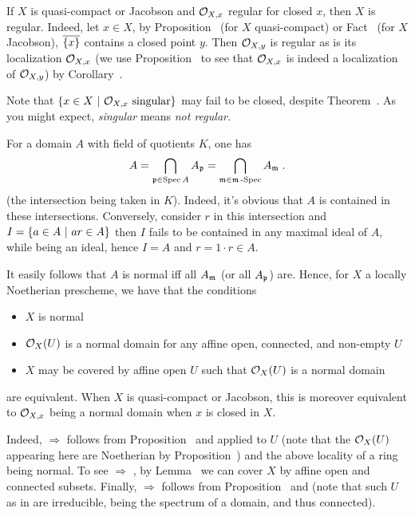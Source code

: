 \documentclass[a4paper,parskip=half,numbers=enddot, DIV=12]{scrreprt}
\begin{document}
\begin{rem*}
    \begin{alphanumerate}
    \item   
        If $X$ is quasi-compact or Jacobson and $\mathcal{O}_{X,x}$ regular for closed $x$, then $X$ is regular. Indeed, let $x\in X$, by Proposition~ (for $X$ quasi-compact) or Fact~ (for $X$ Jacobson), $\overline{\{x\}}$ contains a closed point $y$. Then $\mathcal{O}_{X,y}$ is regular as is its localization $\mathcal{O}_{X,x}$ (we  use Proposition~ to see that $\mathcal{O}_{X,x}$ is indeed a localization of $\mathcal{O}_{X,y}$) by Corollary~.
    \item   
        Note that $\left\{x\in X\ \middle|\  \mathcal{O}_{X,x} \text{ singular}\right\}$ may fail to be closed, despite Theorem~. As you might expect, \emph{singular} means \emph{not regular}.
    \item 
        For a domain $A$ with field of quotients $K$, one has 
        \begin{align*}
        	A=\bigcap_{\mathfrak{p}\in \operatorname{Spec} A}  A_{\mathfrak{p}} = \bigcap_{\mathfrak{m}\in\mathfrak{m}\operatorname{-Spec}} A_{\mathfrak{m}}\;.
        \end{align*}
        (the intersection being taken in $K$). Indeed, it's obvious that $A$ is contained in these intersections. Conversely, consider $r$ in this intersection and $I=\left\{a\in A\ \middle|\  ar\in A\right\}$ then $I$ fails to be contained in any maximal ideal of $A$, while being an ideal, hence $I=A$ and $r=1\cdot r\in A$. 
        
        It easily follows that $A$ is normal iff all $A_{\mathfrak{m}}$ (or all $A_{\mathfrak{p}}$) are. Hence, for $X$ a locally Noetherian prescheme, we have that the conditions
        \begin{itemize}
        	\item[\itememph{\alpha}] $X$ is normal
        	\item[\itememph{\beta}] $\mathcal{O}_X(U)$ is a normal domain for any affine open, connected, and non-empty $U$
        	\item[\itememph{\gamma}] $X$ may be covered by affine open $U$ such that $\mathcal{O}_X(U)$ is a normal domain
        \end{itemize}
         are equivalent. When $X$ is quasi-compact or Jacobson, this is moreover equivalent to $\mathcal{O}_{X,x}$ being a normal domain when $x$ is closed in $X$.
         
         Indeed, \itememph{\alpha} $\Rightarrow$ \itememph{\beta} follows from Proposition~ and  applied to $U$ (note that the $\mathcal{O}_X(U)$ appearing here are Noetherian by Proposition~) and the above locality of a ring being normal. To see \itememph{\beta} $\Rightarrow$ \itememph{\gamma}, by Lemma~ we can cover $X$ by affine open and connected subsets. Finally, \itememph{\gamma} $\Rightarrow$ \itememph{\alpha} follows from Proposition~ and  (note that such $U$ as in \itememph{\gamma} are irreducible, being the spectrum of a domain, and thus connected).
         

\end{alphanumerate}
\end{rem*}
\end{document}
